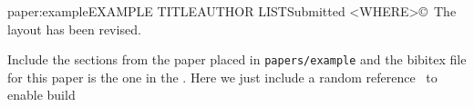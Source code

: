 \begin{paper}{paper:example}{\large EXAMPLE TITLE}{AUTHOR LIST}{Submitted <WHERE>}{\copyright\ <WHO HAS COPYRIGHT>}{The layout has been revised.}

  Include the sections from the paper placed in \texttt{papers/example} and the bibitex file for this paper is the one in the .
  Here we just include a random reference~\cite{9348074} to enable build

  

\tocless
\end{paper}




